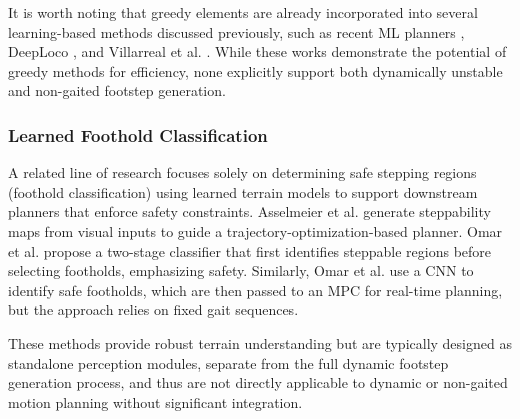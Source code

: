 It is worth noting that greedy elements are already incorporated into
several learning-based methods discussed previously, such as
recent ML planners \cite{bratta_contactnet_2024}, DeepLoco
\cite{peng_deeploco_2017}, and Villarreal et al.
\cite{villarreal_fast_2019}. While these works demonstrate the
potential of greedy methods for efficiency, none explicitly support
both dynamically unstable and non-gaited footstep generation.

\subsubsection{Learned Foothold Classification}

A related line of research focuses solely on determining safe
stepping regions (foothold classification) using learned terrain
models to support downstream planners that enforce safety
constraints. Asselmeier et al.
\cite{asselmeier_steppability-informed_2024} generate steppability
maps from visual inputs to guide a trajectory-optimization-based
planner. Omar et al. \cite{omar_safesteps_2023} propose a two-stage
classifier that first identifies steppable regions before selecting
footholds, emphasizing safety. Similarly, Omar et al.
\cite{omar_fast_2022} use a CNN to identify safe footholds, which are
then passed to an MPC for real-time planning, but the approach relies
on fixed gait sequences.

These methods provide robust terrain understanding but are typically
designed as standalone perception modules, separate from the full
dynamic footstep generation process, and thus are not directly
applicable to dynamic or non-gaited motion planning without
significant integration.
